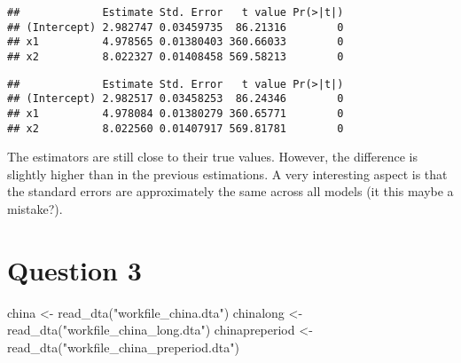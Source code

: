\documentclass[
]{article}
\newenvironment{Shaded}{\begin{snugshade}}{\end{snugshade}}
\newcommand{\AttributeTok}[1]{\textcolor[rgb]{0.77,0.63,0.00}{#1}}
\newcommand{\CommentTok}[1]{\textcolor[rgb]{0.56,0.35,0.01}{\textit{#1}}}
\newcommand{\DecValTok}[1]{\textcolor[rgb]{0.00,0.00,0.81}{#1}}
\newcommand{\FunctionTok}[1]{\textcolor[rgb]{0.00,0.00,0.00}{#1}}
\newcommand{\NormalTok}[1]{#1}
\newcommand{\OtherTok}[1]{\textcolor[rgb]{0.56,0.35,0.01}{#1}}
\newcommand{\SpecialCharTok}[1]{\textcolor[rgb]{0.00,0.00,0.00}{#1}}
\newcommand{\StringTok}[1]{\textcolor[rgb]{0.31,0.60,0.02}{#1}}
\begin{document}
\begin{verbatim}
##             Estimate Std. Error   t value Pr(>|t|)
## (Intercept) 2.982747 0.03459735  86.21316        0
## x1          4.978565 0.01380403 360.66033        0
## x2          8.022327 0.01408458 569.58213        0
\end{verbatim}

\begin{Shaded}
\end{Shaded}

\begin{verbatim}
##             Estimate Std. Error   t value Pr(>|t|)
## (Intercept) 2.982517 0.03458253  86.24346        0
## x1          4.978084 0.01380279 360.65771        0
## x2          8.022560 0.01407917 569.81781        0
\end{verbatim}

The estimators are still close to their true values. However, the
difference is slightly higher than in the previous estimations. A very
interesting aspect is that the standard errors are approximately the
same across all models (it this maybe a mistake?).

\hypertarget{question-3}{%
\section{Question 3}\label{question-3}}

\begin{Shaded}
\begin{Highlighting}[]
\NormalTok{china }\OtherTok{\textless{}{-}} \FunctionTok{read\_dta}\NormalTok{(}\StringTok{"workfile\_china.dta"}\NormalTok{)}
\NormalTok{chinalong }\OtherTok{\textless{}{-}} \FunctionTok{read\_dta}\NormalTok{(}\StringTok{"workfile\_china\_long.dta"}\NormalTok{)}
\NormalTok{chinapreperiod }\OtherTok{\textless{}{-}} \FunctionTok{read\_dta}\NormalTok{(}\StringTok{"workfile\_china\_preperiod.dta"}\NormalTok{)}
\end{Highlighting}
\end{Shaded}
\end{document}
